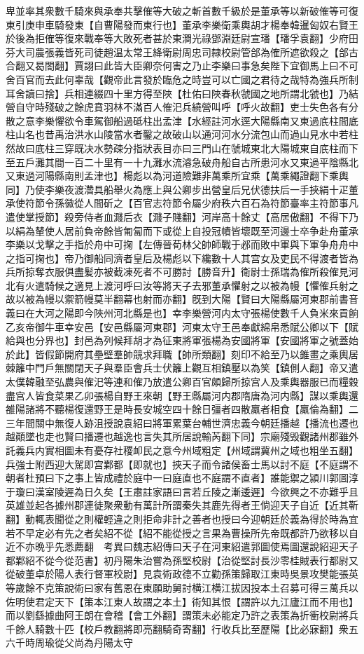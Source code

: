 卑並率其衆數千騎來與承奉共擊傕等大破之斬首數千級於是董承等以新破傕等可復東引庚申車騎發東【自曹陽發而東行也】董承李樂衛乘輿胡才楊奉韓暹匈奴右賢王於後為拒傕等復來戰奉等大敗死者甚於東澗光祿鄧淵廷尉宣璠【璠孚袁翻】少府田芬大司農張義皆死司徒趙温太常王絳衛尉周忠司隸校尉管郃為傕所遮欲殺之【郃古合翻又曷閤翻】賈詡曰此皆大臣卿奈何害之乃止李樂曰事急矣陛下宜御馬上曰不可舍百官而去此何辜哉【觀帝此言發於臨危之時豈可以亡國之君待之哉特為強兵所制耳舍讀曰捨】兵相連綴四十里方得至陜【杜佑曰陜春秋虢國之地所謂北虢也】乃結營自守時殘破之餘虎賁羽林不滿百人傕汜兵繞營叫呼【呼火故翻】吏士失色各有分散之意李樂懼欲令車駕御船過砥柱出孟津【水經註河水逕大陽縣南又東過㡳柱間底柱山名也昔禹治洪水山陵當水者鑿之故破山以通河河水分流包山而過山見水中若柱然故曰底柱三穿既决水勢疎分指狀表目亦曰三門山在虢城東北大陽城東自㡳柱而下至五戶灘其間一百二十里有一十九灘水流濬急破舟船自古所患河水又東過平陰縣北又東過河陽縣南則孟津也】楊彪以為河道險難非萬乘所宜乘【萬乘繩證翻下乘輿同】乃使李樂夜渡濳具船舉火為應上與公卿步出營皇后兄伏德扶后一手挾絹十疋董承使符節令孫徽從人間斫之【百官志符節令屬少府秩六百石為符節臺率主符節事凡遣使掌授節】殺旁侍者血濺后衣【濺子賤翻】河岸高十餘丈【高居傲翻】不得下乃以絹為輦使人居前負帝餘皆匍匐而下或從上自投冠幘皆壞既至河邊士卒争赴舟董承李樂以戈擊之手指於舟中可掬【左傳晉荀林父帥師戰于邲而敗中軍與下軍争舟舟中之指可掬也】帝乃御船同濟者皇后及楊彪以下纔數十人其宫女及吏民不得渡者皆為兵所掠奪衣服俱盡髪亦被截凍死者不可勝討【勝音升】衛尉士孫瑞為傕所殺傕見河北有火遣騎候之適見上渡河呼曰汝等將天子去邪董承懼射之以被為幔【懼傕兵射之故以被為幔以禦箭幔莫半翻幕也射而亦翻】旣到大陽【賢曰大陽縣屬河東郡前書音義曰在大河之陽即今陜州河北縣是也】幸李樂營河内太守張楊使數千人負米來貢餉乙亥帝御牛車幸安邑【安邑縣屬河東郡】河東太守王邑奉獻綿帛悉賦公卿以下【賦給與也分界也】封邑為列候拜胡才為征東將軍張楊為安國將軍【安國將軍之號蓋始於此】皆假節開府其壘壁羣帥競求拜職【帥所類翻】刻印不給至乃以錐畫之乘輿居棘籬中門戶無關閉天子與羣臣會兵士伏籬上觀互相鎮壓以為笑【鎮側人翻】帝又遣太僕韓融至弘農與傕汜等連和傕乃放遣公卿百官頗歸所掠宫人及乘輿器服已而糧穀盡宫人皆食菜果乙卯張楊自野王來朝【野王縣屬河内郡隋唐為河内縣】謀以乘輿還雒陽諸將不聽楊復還野王是時長安城空四十餘日彊者四散羸者相食【羸倫為翻】二三年間關中無復人跡沮授說袁紹曰將軍累葉台輔世濟忠義今朝廷播越【播流也遷也越顚墜也走也賢曰播遷也越逸也言失其所居說輸芮翻下同】宗廟殘毁觀諸州郡雖外託義兵内實相圖未有憂存社稷卹民之意今州域粗定【州域謂冀州之域也粗坐五翻】兵強士附西迎大駕即宫鄴都【即就也】挾天子而令諸侯畜士馬以討不庭【不庭謂不朝者杜預曰下之事上皆成禮於庭中一曰庭直也不庭謂不直者】誰能禦之潁川郭圖淳于瓊曰漢室陵遲為日久矣【王肅註家語曰言若丘陵之漸逶遲】今欲興之不亦難乎且英雄並起各據州郡連徒聚衆動有萬計所謂秦失其鹿先得者王倘迎天子自近【近其靳翻】動輒表聞從之則權輕違之則拒命非計之善者也授曰今迎朝廷於義為得於時為宜若不早定必有先之者矣紹不從【紹不能從授之言果為曹操所先帝既都許乃欲移以自近不亦晩乎先悉薦翻　考異曰魏志紹傳曰天子在河東紹遣郭圖使焉圖還說紹迎天子都鄴紹不從今從范書】初丹陽朱治嘗為孫堅校尉【治從堅討長沙零桂賊表行都尉又從破董卓於陽人表行督軍校尉】見袁術政德不立勸孫策歸取江東時吳景攻樊能張英等歲餘不克策說術曰家有舊恩在東願助舅討横江横江拔因投本土召募可得三萬兵以佐明使君定天下【策本江東人故謂之本土】術知其恨【謂許以九江廬江而不用也】而以劉繇據曲阿王朗在會稽【會工外翻】謂策未必能定乃許之表策為折衝校尉將兵千餘人騎數十匹【校戶教翻將即亮翻騎奇寄翻】行收兵比至歷陽【比必寐翻】衆五六千時周瑜從父尚為丹陽太守